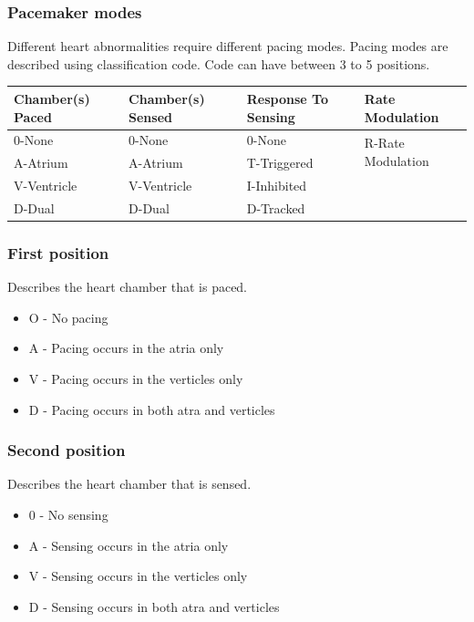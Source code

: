 \documentclass[xcolor=dvipsnames]{beamer}
\begin{document}
  \begin{frame}{}
    \frametitle{Pacemaker modes}
    Different heart abnormalities require different pacing modes. Pacing modes are described using classification code. Code can have between 3 to 5 positions.

    \begin{tabularx}{\textwidth}{|X|X|X|X|}
      \hline
              Chamber(s) Paced & Chamber(s) Sensed & Response To Sensing & Rate Modulation  \\ \hline
              0-None           & 0-None            & 0-None              & \multirow{2}{2cm}{R-Rate Modulation}  \\ %
              A-Atrium         & A-Atrium          & T-Triggered         &                    \\ %
              V-Ventricle      & V-Ventricle       & I-Inhibited         &                    \\ %
              D-Dual           & D-Dual            & D-Tracked           &                  \\
      \hline
    \end{tabularx}

  \end{frame}

  \begin{frame}
    \frametitle{First position}
Describes the heart chamber that is paced.
\begin{itemize}
  \item O - No pacing
      \item A - Pacing occurs in the atria only
      \item V - Pacing occurs in the verticles only
      \item D - Pacing occurs in both atra and verticles
\end{itemize}
  \end{frame}

  \begin{frame}
    \frametitle{Second position}
Describes the heart chamber that is sensed.
\begin{itemize}
  \item 0 - No sensing
  \item A - Sensing occurs in the atria only
  \item V - Sensing occurs in the verticles only
  \item D - Sensing occurs in both atra and verticles
\end{itemize}

  \end{frame}
\end{document}
